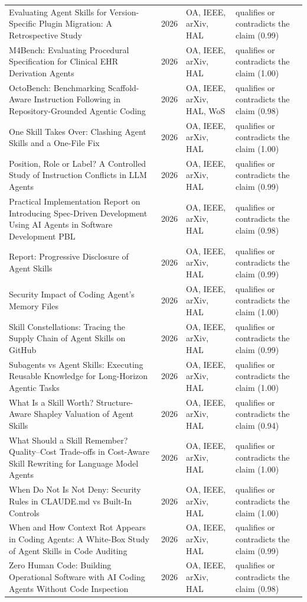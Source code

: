 \begin{longtable}{@{}%
  >{\raggedright\arraybackslash}p{}c%
  >{\raggedright\arraybackslash}p{}%
  >{\raggedright\arraybackslash}p{}@{}}
Evaluating Agent Skills for Version-Specific Plugin Migration: A Retrospective Study & 2026 & OA, IEEE, arXiv, HAL & qualifies or contradicts the claim (0.99) \\
M4Bench: Evaluating Procedural Specification for Clinical EHR Derivation Agents & 2026 & OA, IEEE, arXiv, HAL & qualifies or contradicts the claim (1.00) \\
OctoBench: Benchmarking Scaffold-Aware Instruction Following in Repository-Grounded Agentic Coding & 2026 & OA, IEEE, arXiv, HAL, WoS & qualifies or contradicts the claim (0.98) \\
One Skill Takes Over: Clashing Agent Skills and a One-File Fix & 2026 & OA, IEEE, arXiv, HAL & qualifies or contradicts the claim (1.00) \\
Position, Role or Label? A Controlled Study of Instruction Conflicts in LLM Agents & 2026 & OA, IEEE, arXiv, HAL & qualifies or contradicts the claim (0.99) \\
Practical Implementation Report on Introducing Spec-Driven Development Using AI Agents in Software Development PBL & 2026 & OA, IEEE, arXiv, HAL & qualifies or contradicts the claim (0.98) \\
Report: Progressive Disclosure of Agent Skills & 2026 & OA, IEEE, arXiv, HAL & qualifies or contradicts the claim (0.99) \\
Security Impact of Coding Agent's Memory Files & 2026 & OA, IEEE, arXiv, HAL & qualifies or contradicts the claim (1.00) \\
Skill Constellations: Tracing the Supply Chain of Agent Skills on GitHub & 2026 & OA, IEEE, arXiv, HAL & qualifies or contradicts the claim (0.99) \\
Subagents vs Agent Skills: Executing Reusable Knowledge for Long-Horizon Agentic Tasks & 2026 & OA, IEEE, arXiv, HAL & qualifies or contradicts the claim (1.00) \\
What Is a Skill Worth? Structure-Aware Shapley Valuation of Agent Skills & 2026 & OA, IEEE, arXiv, HAL & qualifies or contradicts the claim (0.94) \\
What Should a Skill Remember? Quality--Cost Trade-offs in Cost-Aware Skill Rewriting for Language Model Agents & 2026 & OA, IEEE, arXiv, HAL & qualifies or contradicts the claim (1.00) \\
When \textquotedbl{}Do Not\textquotedbl{} Is Not Deny: Security Rules in CLAUDE.md vs Built-In Controls & 2026 & OA, IEEE, arXiv, HAL & qualifies or contradicts the claim (1.00) \\
When and How Context Rot Appears in Coding Agents: A White-Box Study of Agent Skills in Code Auditing & 2026 & OA, IEEE, arXiv, HAL & qualifies or contradicts the claim (0.99) \\
Zero Human Code: Building Operational Software with AI Coding Agents Without Code Inspection & 2026 & OA, IEEE, arXiv, HAL & qualifies or contradicts the claim (0.98) \\
\end{longtable}
\endgroup

